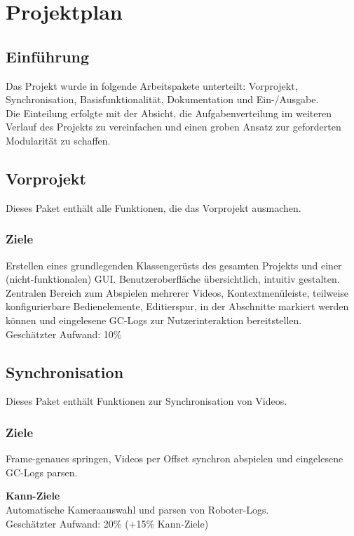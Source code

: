 \chapter{Projektplan}
\section{Einführung}
Das Projekt wurde in folgende Arbeitspakete unterteilt: Vorprojekt, Synchronisation, Basisfunktionalität, Dokumentation und Ein-/Ausgabe.\\
Die Einteilung erfolgte mit der Absicht, die Aufgabenverteilung im weiteren Verlauf des Projekts zu vereinfachen und einen groben Ansatz zur geforderten Modularität zu schaffen.

\section{Vorprojekt}
Dieses Paket enthält alle Funktionen, die das Vorprojekt ausmachen.
\subsection{Ziele}
Erstellen eines grundlegenden Klassengerüsts des gesamten Projekts und einer (nicht-funktionalen) GUI. 
Benutzeroberfläche übersichtlich, intuitiv gestalten.\\
Zentralen Bereich zum Abspielen mehrerer Videos, Kontextmenüleiste, teilweise konfigurierbare Bedienelemente, Editierspur, in der Abschnitte markiert werden können und eingelesene GC-Logs zur Nutzerinteraktion bereitstellen.\\

Geschätzter Aufwand: 10\%

\section{Synchronisation}
Dieses Paket enthält Funktionen zur Synchronisation von Videos.

\subsection{Ziele}
Frame-genaues springen, Videos per Offset synchron abspielen und eingelesene GC-Logs parsen.

\textbf{Kann-Ziele}\\
Automatische Kameraauswahl und parsen von Roboter-Logs.\\

Geschätzter Aufwand: 20\% (+15\% Kann-Ziele)

